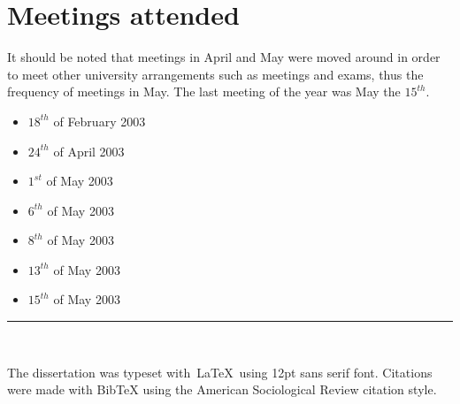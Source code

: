 \documentclass[a4paper,12pt,titlepage]{report}
\begin{document}
  \chapter{Meetings attended}
  It should be noted that meetings in April and May were moved around
  in order to meet other university arrangements such as meetings and exams,
  thus the frequency of meetings in May.
  The last meeting of the year was May the \begin{math} 15^{th} \end{math}.
  \begin{itemize}
  \item \begin{math}18^{th}\end{math} of February 2003
  \item \begin{math}24^{th}\end{math} of April 2003
  \item \begin{math}1^{st}\end{math} of May 2003
  \item \begin{math}6^{th}\end{math} of May 2003
  \item \begin{math}8^{th}\end{math} of May 2003
  \item \begin{math}13^{th}\end{math} of May 2003
  \item \begin{math}15^{th}\end{math} of May 2003
  \end{itemize}

  \newpage 
  
  
  \nocite{*}

  \bigskip
  \begin{center}
    \rule{0.9\textwidth}{0.011em}\\
  \end{center}
  The dissertation was typeset with~\LaTeX~using 12pt sans serif font.
  Citations were made with BibTeX using the American Sociological Review
  citation style.
\end{document}
